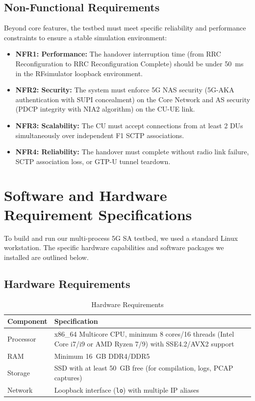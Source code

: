 \subsection{Non-Functional Requirements}
\justify
Beyond core features, the testbed must meet specific reliability and performance constraints to ensure a stable simulation environment:

\begin{itemize}[leftmargin=*]
    \item \textbf{NFR1: Performance:} The handover interruption time (from RRC Reconfiguration to RRC Reconfiguration Complete) should be under 50~ms in the RFsimulator loopback environment.
    
    \item \textbf{NFR2: Security:} The system must enforce 5G NAS security (5G-AKA authentication with SUPI concealment) on the Core Network and AS security (PDCP integrity with NIA2 algorithm) on the CU-UE link.
    
    \item \textbf{NFR3: Scalability:} The CU must accept connections from at least 2 DUs simultaneously over independent F1 SCTP associations.
    
    \item \textbf{NFR4: Reliability:} The handover must complete without radio link failure, SCTP association loss, or GTP-U tunnel teardown.
\end{itemize}


\section{Software and Hardware Requirement Specifications}
\justify
To build and run our multi-process 5G SA testbed, we used a standard Linux workstation. The specific hardware capabilities and software packages we installed are outlined below.

\subsection{Hardware Requirements}
\begin{table}[H]
\centering
\begin{tabular}{|l|p{10cm}|}
\hline
\textbf{Component} & \textbf{Specification} \\ \hline
Processor & x86\_64 Multicore CPU, minimum 8 cores/16 threads (Intel Core i7/i9 or AMD Ryzen 7/9) with SSE4.2/AVX2 support \\ \hline
RAM & Minimum 16~GB DDR4/DDR5 \\ \hline
Storage & SSD with at least 50~GB free (for compilation, logs, PCAP captures) \\ \hline
Network & Loopback interface (\texttt{lo}) with multiple IP aliases \\ \hline
\end{tabular}
\caption{Hardware Requirements}
\end{table}

